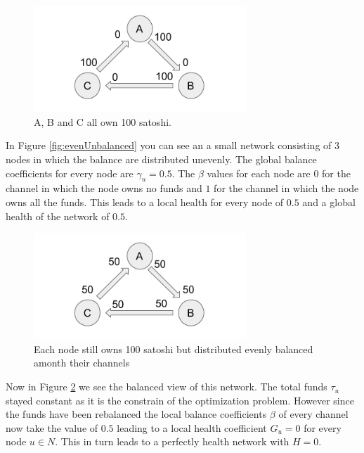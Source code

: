 \documentclass[a4paper]{paper}
\begin{document}
\begin{figure}
 \centering
 \includegraphics[width=8cm]{img/evenUnbalanced.png}
 \caption{A, B and C all own 100 satoshi.}
 \label{fig:evenUnalanced}
\end{figure}
In Figure \ref{fig:evenUnbalanced} you can see an a small network consisting of $3$ nodes in which the balance are distributed unevenly.
The global balance coefficients for every node are $\gamma_u=0.5$.
The $\beta$ values for each node are $0$ for the channel in which the node owns no funds and $1$ for the channel in which the node owns all the funds.
This leads to a local health for every node of $0.5$ and a global health of the network of $0.5$.
\begin{figure}
 \centering
 \includegraphics[width=8cm]{img/evenBalanced.png}
 \caption{Each node still owns 100 satoshi but distributed evenly balanced amonth their channels}
 \label{fig:evenBalanced}
\end{figure}
Now in Figure \ref{fig:evenBalanced} we see the balanced view of this network.
The total funds $\tau_u$ stayed constant as it is the constrain of the optimization problem.
However since the funds have been rebalanced the local balance coefficients $\beta$ of every channel now take the value of $0.5$ leading to a local health coefficient $G_u=0$ for every node $u\in N$.
This in turn leads to a perfectly health network with $H=0$.
\end{document}
